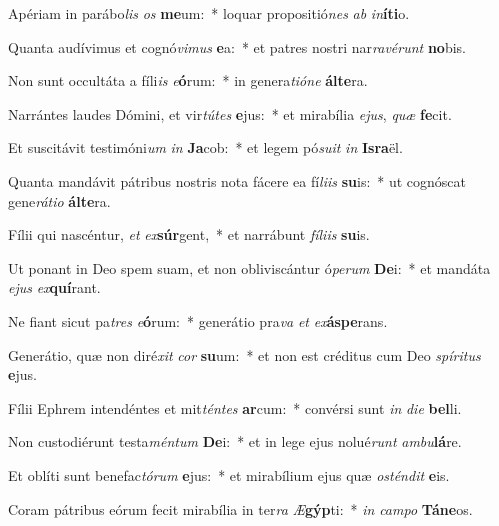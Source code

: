\item Apériam in parábo\textit{lis} \textit{os} \textbf{me}um:~* loquar propositió\textit{nes} \textit{ab} \textit{in}\textbf{í}\textbf{ti}o.
\item Quanta audívimus et cognó\textit{vi}\textit{mus} \textbf{e}a:~* et patres nostri nar\textit{ra}\textit{vé}\textit{runt} \textbf{no}bis.
\item Non sunt occultáta a fíli\textit{is} \textit{e}\textbf{ó}rum:~* in genera\textit{ti}\textit{ó}\textit{ne} \textbf{ál}\textbf{te}ra.
\item Narrántes laudes Dómini, et vir\textit{tú}\textit{tes} \textbf{e}jus:~* et mirabília \textit{e}\textit{jus}, \textit{quæ} \textbf{fe}cit.
\item Et suscitávit testimóni\textit{um} \textit{in} \textbf{Ja}cob:~* et legem pó\textit{su}\textit{it} \textit{in} \textbf{Is}\textbf{ra}ël.
\item Quanta mandávit pátribus nostris nota fácere ea fí\textit{li}\textit{is} \textbf{su}is:~* ut cognóscat gene\textit{rá}\textit{ti}\textit{o} \textbf{ál}\textbf{te}ra.
\item Fílii qui nascéntur, \textit{et} \textit{ex}\textbf{súr}gent,~* et narrábunt \textit{fí}\textit{li}\textit{is} \textbf{su}is.
\item Ut ponant in Deo spem suam, et non obliviscántur ó\textit{pe}\textit{rum} \textbf{De}i:~* et mandáta \textit{e}\textit{jus} \textit{ex}\textbf{quí}rant.
\item Ne fiant sicut pa\textit{tres} \textit{e}\textbf{ó}rum:~* generátio pra\textit{va} \textit{et} \textit{ex}\textbf{ás}\textbf{pe}rans.
\item Generátio, quæ non diré\textit{xit} \textit{cor} \textbf{su}um:~* et non est créditus cum Deo \textit{spí}\textit{ri}\textit{tus} \textbf{e}jus.
\item Fílii Ephrem intendéntes et mit\textit{tén}\textit{tes} \textbf{ar}cum:~* convérsi sunt \textit{in} \textit{di}\textit{e} \textbf{bel}li.
\item Non custodiérunt testa\textit{mén}\textit{tum} \textbf{De}i:~* et in lege ejus nolué\textit{runt} \textit{am}\textit{bu}\textbf{lá}re.
\item Et oblíti sunt benefac\textit{tó}\textit{rum} \textbf{e}jus:~* et mirabílium ejus quæ \textit{os}\textit{tén}\textit{dit} \textbf{e}is.
\item Coram pátribus eórum fecit mirabília in ter\textit{ra} \textit{Æ}\textbf{gýp}ti:~* \textit{in} \textit{cam}\textit{po} \textbf{Tá}\textbf{ne}os.
